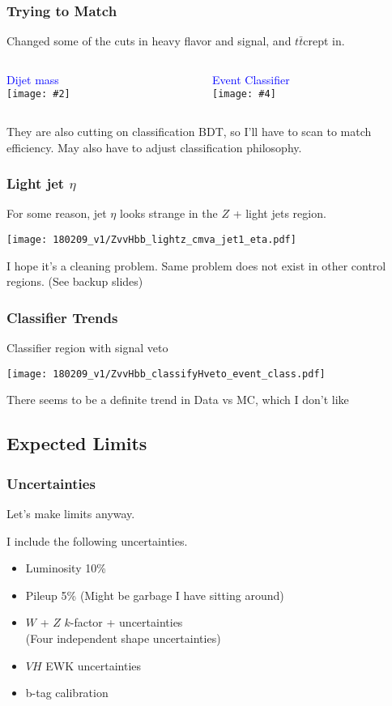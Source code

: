 \documentclass{beamer}
\newcommand{\twofigs}[4]{
  \begin{columns}
    \begin{column}{0.5\linewidth}
      \centering
      \textcolor{blue}{#1} \\
      \texttt{[image: \#2]}
    \end{column}
    \begin{column}{0.5\linewidth}
      \centering
      \textcolor{blue}{#3} \\
      \texttt{[image: \#4]}
    \end{column}
  \end{columns}
}
\newcommand{\ttbar}{\ensuremath{t\bar{t}}}
\begin{document}
\begin{frame}
  \frametitle{Trying to Match}

  Changed some of the cuts in heavy flavor and signal,
  and \ttbar crept in.

  \twofigs{Dijet mass}
          {180209_v1/ZvvHbb_heavyz_cmva_hbb_m.pdf}
          {Event Classifier}
          {180209_v1/ZvvHbb_heavyz_event_class.pdf}

  They are also cutting on classification BDT,
  so I'll have to scan to match efficiency.
  May also have to adjust classification philosophy.

\end{frame}

\begin{frame}
  \frametitle{Light jet $\eta$}
  For some reason, jet $\eta$ looks strange in the $Z$ + light jets region.

  \begin{center}
    \texttt{[image: 180209\_v1/ZvvHbb\_lightz\_cmva\_jet1\_eta.pdf]}
  \end{center}

  I hope it's a cleaning problem.
  Same problem does not exist in other control regions. (See backup slides)
\end{frame}

\begin{frame}
  \frametitle{Classifier Trends}
  Classifier region with signal veto

  \begin{center}
    \texttt{[image: 180209\_v1/ZvvHbb\_classifyHveto\_event\_class.pdf]}
  \end{center}

  There seems to be a definite trend in Data vs MC, which I don't like
\end{frame}

\subsection{Expected Limits}

\begin{frame}
  \frametitle{Uncertainties}
  Let's make limits anyway.

  \vspace{24pt}

  I include the following uncertainties.

  \begin{itemize}
  \item Luminosity 10\%
  \item Pileup 5\% (Might be garbage I have sitting around)
  \item $W$ + $Z$ $k$-factor  +  uncertainties \\
    (Four independent shape uncertainties)
  \item $VH$ EWK uncertainties
  \item b-tag calibration
  \end{itemize}

\end{frame}
\end{document}
